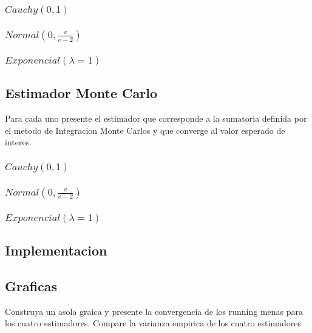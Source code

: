 \documentclass{article}
\begin{document}
\subsubsection{$Cauchy(0,1)$}
\subsubsection{$Normal(0, \frac{v}{v-2})$}
\subsubsection{$Exponencial(\lambda=1)$}

\subsection{Estimador Monte Carlo}
Para cada uno presente el estimador que corresponde a la sumatoria definida por el metodo de Integracion
Monte Carlos y que converge al valor esperado de interes.
\subsubsection{$Cauchy(0,1)$}
\subsubsection{$Normal(0, \frac{v}{v-2})$}
\subsubsection{$Exponencial(\lambda=1)$}

\subsection{Implementacion}

\subsection{Graficas}
Construya un asola graica y presente la convergencia de los running menas para los cuatro estimadores. Compare la varianza empirica de los
cuatro estimadores
\end{document}
